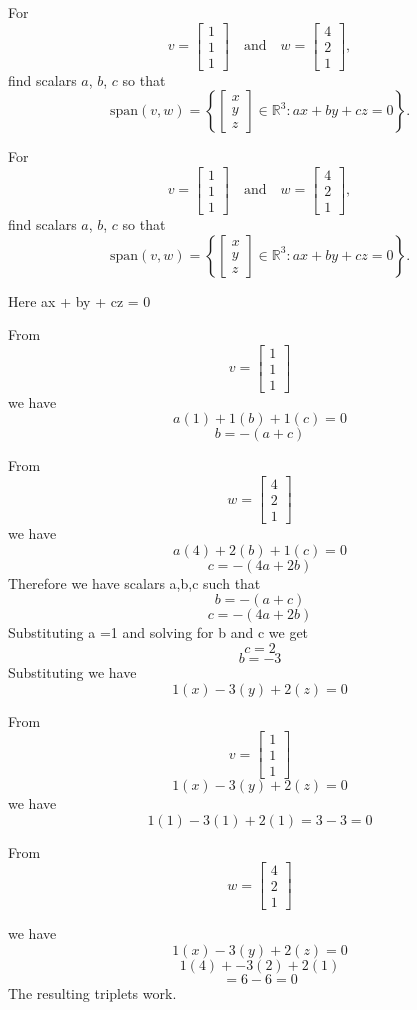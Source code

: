 

For 
\[
v = 
\begin{bmatrix}
1 \\
1 \\
1
\end{bmatrix}
\quad \text{and} \quad
w = 
\begin{bmatrix}
4 \\
2 \\
1
\end{bmatrix},
\]
find scalars $a$, $b$, $c$ so that
\[
\text{span}(v, w) = \left\{
\begin{bmatrix}
x \\
y \\
z
\end{bmatrix} \in \mathbb{R}^3 : ax + by + cz = 0
\right\}.
\]

For 
\[
v = 
\begin{bmatrix}
1 \\
1 \\
1
\end{bmatrix}
\quad \text{and} \quad
w = 
\begin{bmatrix}
4 \\
2 \\
1
\end{bmatrix},
\]
find scalars $a$, $b$, $c$ so that
\[
\text{span}(v, w) = \left\{
\begin{bmatrix}
x \\
y \\
z
\end{bmatrix} \in \mathbb{R}^3 : ax + by + cz = 0
\right\}.
\]

Here 
ax + by + cz = 0

From \[
v = 
\begin{bmatrix}
1 \\
1 \\
1
\end{bmatrix}
\]
we have 
\[
a(1) + 1(b) + 1(c) = 0
\]
\[
b = -(a+c)
\]

From \[
w = 
\begin{bmatrix}
4 \\
2 \\
1
\end{bmatrix}
\]
we have 
\[
a(4) + 2(b) + 1(c) = 0
\]
\[
c = -(4a+2b)
\]
Therefore we have scalars a,b,c such that 
\[
 b= -(a+c)
 \]
\[ c = -(4a+2b)
\]
Substituting a =1 and solving for b and c we get
\[
c=2
\]
\[
b =-3
\]
Substituting we have 
\[
1(x) -3(y) + 2(z) = 0
\]

From \[
v = 
\begin{bmatrix}
1 \\
1 \\
1
\end{bmatrix}
\]
\[
1(x)-3(y) + 2(z) = 0
\]
we have 
\[
1(1) -3(1) + 2(1) = 3 - 3 =0
\]


From \[
w = 
\begin{bmatrix}
4 \\
2 \\
1
\end{bmatrix}
\]

we have
\[
1(x) -3(y) + 2(z) = 0
\]
\[
1(4) + -3(2) + 2(1)
\]
\[
= 6 - 6 = 0
\]
The resulting triplets work.